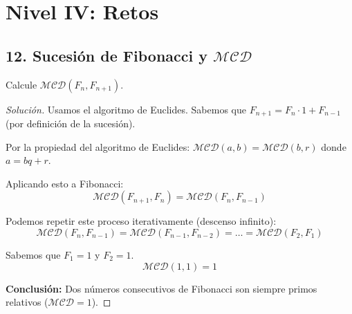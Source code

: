 \documentclass[12pt, letterpaper]{article}
\newenvironment{solucion}
    {\begin{proof}[Solución]}
    {\end{proof}}
\begin{document}
\section*{Nivel IV: Retos}

\subsection*{12. Sucesión de Fibonacci y $\mathcal{MCD}$}
Calcule $\mathcal{MCD}(F_{n}, F_{n+1})$.

\begin{solucion}
    Usamos el algoritmo de Euclides.
    Sabemos que $F_{n+1} = F_n \cdot 1 + F_{n-1}$ (por definición de la sucesión).
    
    Por la propiedad del algoritmo de Euclides: $\mathcal{MCD}(a, b) = \mathcal{MCD}(b, r)$ donde $a = bq + r$.
    
    Aplicando esto a Fibonacci:
    \[ \mathcal{MCD}(F_{n+1}, F_n) = \mathcal{MCD}(F_n, F_{n-1}) \]
    
    Podemos repetir este proceso iterativamente (descenso infinito):
    \[ \mathcal{MCD}(F_n, F_{n-1}) = \mathcal{MCD}(F_{n-1}, F_{n-2}) = \dots = \mathcal{MCD}(F_2, F_1) \]
    
    Sabemos que $F_1 = 1$ y $F_2 = 1$.
    \[ \mathcal{MCD}(1, 1) = 1 \]
    
    \textbf{Conclusión:} Dos números consecutivos de Fibonacci son siempre primos relativos ($\mathcal{MCD} = 1$).
\end{solucion}
\end{document}
